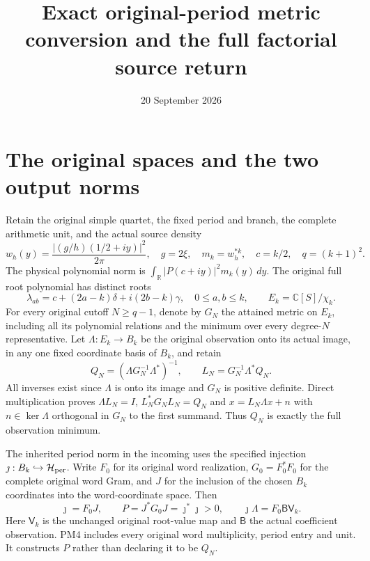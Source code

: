 \documentclass[11pt]{article}
\title{Exact original-period metric conversion and the full factorial source return}
\author{}
\date{20 September 2026}
\newcommand{\C}{\mathbb C}
\newcommand{\R}{\mathbb R}
\begin{document}
\maketitle

\section{The original spaces and the two output norms}
Retain the original simple quartet, the fixed period and branch, the
complete arithmetic unit, and the actual source density
\[
 w_h(y)=\frac{|(g/h)(1/2+iy)|^2}{2\pi},\quad g=2\xi,
 \quad m_k=w_h^{*k},\quad c=k/2,\quad q=(k+1)^2.                  \tag{PM1}
\]
The physical polynomial norm is
$\int_\R|P(c+iy)|^2m_k(y)\,dy$.  The original full root polynomial
has distinct roots
\[
 \lambda_{ab}=c+(2a-k)\delta+i(2b-k)\gamma,
 \quad0\le a,b\le k,
 \qquad E_k=\C[S]/\chi_k.                                      \tag{PM2}
\]
For every original cutoff $N\ge q-1$, denote by $G_N$ the attained
metric on $E_k$, including all its polynomial relations and the
minimum over every degree-$N$ representative.  Let
$\Lambda:E_k\to B_k$ be the original observation onto its actual
image, in any one fixed coordinate basis of $B_k$, and retain
\[
 Q_N=(\Lambda G_N^{-1}\Lambda^*)^{-1},\qquad
 L_N=G_N^{-1}\Lambda^*Q_N.                                     \tag{PM3}
\]
All inverses exist since $\Lambda$ is onto its image and $G_N$
is positive definite.  Direct multiplication proves
$\Lambda L_N=I$, $L_N^*G_NL_N=Q_N$ and
$x=L_N\Lambda x+n$ with $n\in\ker\Lambda$ orthogonal in $G_N$
to the first summand.  Thus $Q_N$ is exactly the full observation
minimum.

The inherited period norm in the incoming
uses the specified injection $\jmath:B_k\hookrightarrow\mathcal H_{\rm per}$.
Write $F_0$ for its original word realization, $G_0=F_0^*F_0$ for
the complete original word Gram, and $J$ for the inclusion of
the chosen $B_k$ coordinates into the word-coordinate space.
Then
\[
 \jmath=F_0J,\qquad P=J^*G_0J=\jmath^*\jmath>0,
 \qquad\jmath\Lambda=F_0\mathsf B\mathsf V_k.                   \tag{PM4}
\]
Here $\mathsf V_k$ is the unchanged original root-value map and
$\mathsf B$ the actual coefficient observation.  PM4 includes
every original word multiplicity, period entry and unit.  It
constructs $P$ rather than declaring it to be $Q_N$.
\end{document}
